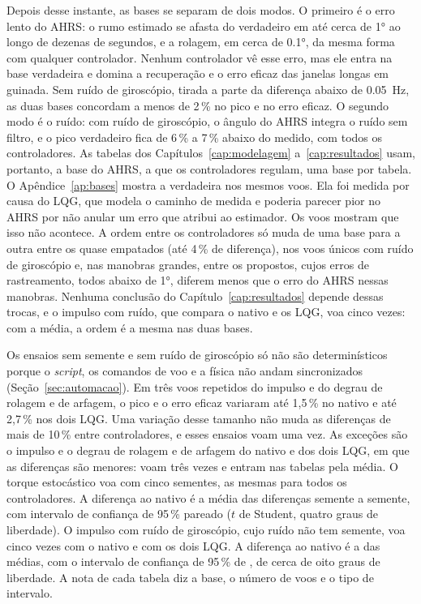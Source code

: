 Depois desse instante, as bases se separam de dois modos. O primeiro é o erro
lento do AHRS: o rumo estimado se afasta do verdadeiro em até cerca de
\ang{1} ao longo de dezenas de segundos, e a rolagem, em cerca de
\ang{0.1}, da mesma forma com qualquer controlador. Nenhum controlador vê
esse erro, mas ele entra na base verdadeira e domina a recuperação e o erro
eficaz das janelas longas em guinada. Sem ruído de giroscópio, tirada a parte
da diferença abaixo de \SI{0.05}{\hertz}, as duas bases concordam a menos de
2\,\% no pico e no erro eficaz. O segundo modo é o ruído: com ruído de
giroscópio, o ângulo do AHRS integra o ruído sem filtro, e o pico verdadeiro
fica de 6\,\% a 7\,\% abaixo do medido, com todos os controladores. As
tabelas dos Capítulos~\ref{cap:modelagem} a~\ref{cap:resultados} usam,
portanto, a base do AHRS, a que os controladores regulam, uma base por
tabela. O Apêndice~\ref{ap:bases} mostra a verdadeira nos mesmos voos. Ela
foi medida por causa do LQG, que modela o caminho de medida e poderia
parecer pior no AHRS por não anular um erro que atribui ao estimador. Os
voos mostram que isso não acontece. A ordem entre os controladores só muda
de uma base para a outra entre os quase empatados (até 4\,\% de
diferença), nos voos únicos com ruído de giroscópio e, nas manobras
grandes, entre os propostos, cujos erros de rastreamento, todos abaixo de
\ang{1}, diferem menos que o erro do AHRS nessas manobras. Nenhuma
conclusão do Capítulo~\ref{cap:resultados} depende dessas trocas, e o
impulso com ruído, que compara o nativo e os LQG, voa cinco vezes: com a
média, a ordem é a mesma nas duas bases.

Os ensaios sem semente e sem ruído de giroscópio só não são determinísticos
porque o \textit{script}, os comandos de voo e a física não andam
sincronizados (Seção~\ref{sec:automacao}). Em três voos repetidos do impulso
e do degrau de rolagem e de arfagem, o pico e o erro eficaz variaram até
1,5\,\% no nativo e até 2,7\,\% nos dois LQG. Uma
variação desse tamanho não muda as diferenças de mais de 10\,\% entre
controladores, e esses ensaios voam uma vez. As exceções são o impulso e o
degrau de rolagem e de arfagem do nativo e dos dois LQG, em que as
diferenças são menores: voam três vezes e entram nas tabelas pela média. O torque estocástico voa com
cinco sementes, as mesmas para todos os controladores. A diferença ao nativo
é a média das diferenças semente a semente, com intervalo de confiança de
95\,\% pareado ($t$ de Student, quatro graus de liberdade). O impulso com
ruído de giroscópio, cujo ruído não tem semente, voa cinco vezes com o
nativo e com os dois LQG. A diferença ao nativo é a das médias, com o
intervalo de confiança de 95\,\% de , de cerca de oito
graus de liberdade. A nota de cada tabela diz a base, o número de voos e o
tipo de intervalo.

